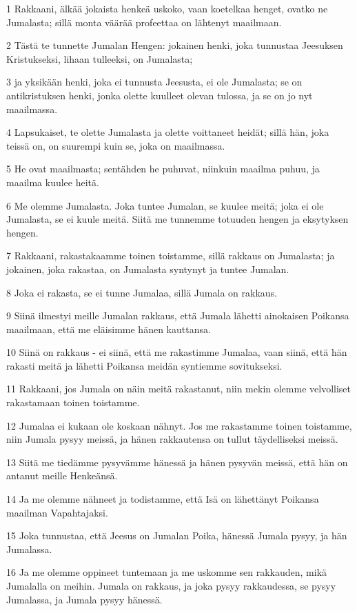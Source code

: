 \par 1 Rakkaani, älkää jokaista henkeä uskoko, vaan koetelkaa henget, ovatko ne Jumalasta; sillä monta väärää profeettaa on lähtenyt maailmaan.
\par 2 Tästä te tunnette Jumalan Hengen: jokainen henki, joka tunnustaa Jeesuksen Kristukseksi, lihaan tulleeksi, on Jumalasta;
\par 3 ja yksikään henki, joka ei tunnusta Jeesusta, ei ole Jumalasta; se on antikristuksen henki, jonka olette kuulleet olevan tulossa, ja se on jo nyt maailmassa.
\par 4 Lapsukaiset, te olette Jumalasta ja olette voittaneet heidät; sillä hän, joka teissä on, on suurempi kuin se, joka on maailmassa.
\par 5 He ovat maailmasta; sentähden he puhuvat, niinkuin maailma puhuu, ja maailma kuulee heitä.
\par 6 Me olemme Jumalasta. Joka tuntee Jumalan, se kuulee meitä; joka ei ole Jumalasta, se ei kuule meitä. Siitä me tunnemme totuuden hengen ja eksytyksen hengen.
\par 7 Rakkaani, rakastakaamme toinen toistamme, sillä rakkaus on Jumalasta; ja jokainen, joka rakastaa, on Jumalasta syntynyt ja tuntee Jumalan.
\par 8 Joka ei rakasta, se ei tunne Jumalaa, sillä Jumala on rakkaus.
\par 9 Siinä ilmestyi meille Jumalan rakkaus, että Jumala lähetti ainokaisen Poikansa maailmaan, että me eläisimme hänen kauttansa.
\par 10 Siinä on rakkaus - ei siinä, että me rakastimme Jumalaa, vaan siinä, että hän rakasti meitä ja lähetti Poikansa meidän syntiemme sovitukseksi.
\par 11 Rakkaani, jos Jumala on näin meitä rakastanut, niin mekin olemme velvolliset rakastamaan toinen toistamme.
\par 12 Jumalaa ei kukaan ole koskaan nähnyt. Jos me rakastamme toinen toistamme, niin Jumala pysyy meissä, ja hänen rakkautensa on tullut täydelliseksi meissä.
\par 13 Siitä me tiedämme pysyvämme hänessä ja hänen pysyvän meissä, että hän on antanut meille Henkeänsä.
\par 14 Ja me olemme nähneet ja todistamme, että Isä on lähettänyt Poikansa maailman Vapahtajaksi.
\par 15 Joka tunnustaa, että Jeesus on Jumalan Poika, hänessä Jumala pysyy, ja hän Jumalassa.
\par 16 Ja me olemme oppineet tuntemaan ja me uskomme sen rakkauden, mikä Jumalalla on meihin. Jumala on rakkaus, ja joka pysyy rakkaudessa, se pysyy Jumalassa, ja Jumala pysyy hänessä.
